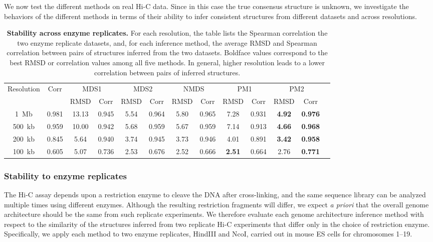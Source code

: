 We now test the different methods on real Hi-C data. Since in this case the
true consensus structure is unknown, we investigate the behaviors of the
different methods in terms of their ability to infer consistent structures
from different datasets and across resolutions.

\begin{table*}
\begin{center}
\footnotesize
\begin{tabular}{ccccccccccccc}
\hline
{\tiny Resolution} &  Corr &
\multicolumn{2}{c}{MDS1} &
\multicolumn{2}{c}{MDS2} &
\multicolumn{2}{c}{NMDS} &
\multicolumn{2}{c}{PM1} &
\multicolumn{2}{c}{PM2} \\
&& {\tiny RMSD} & Corr & {\tiny RMSD} & Corr & {\tiny RMSD} &Corr & {\tiny
RMSD} & Corr & {\tiny RMSD} & Corr \\
\hline
1~Mb  & 0.981 & 13.13 & 0.945 & 5.54 & 0.964 &  5.80 & 0.965 & 7.28  & 0.931 & \textbf{4.92} & \textbf{0.976} \\
500~kb & 0.959 & 10.00 & 0.942 & 5.68 & 0.959 & 5.67 & 0.959 & 7.14 & 0.913 & \textbf{4.66} & \textbf{0.968} \\
200~kb & 0.845 & 5.64 & 0.940 & 3.74 & 0.945 & 3.73 & 0.946 & 4.01 & 0.891 & \textbf{3.42} & \textbf{0.958} \\
100~kb &  0.605 & 5.07 & 0.736 & 2.53  & 0.676 & 2.52 & 0.666 & \textbf{2.51} & 0.664 & 2.76 & \textbf{0.771}\\
\hline
\end{tabular}
\end{center}

\caption{\textbf{Stability across enzyme replicates.} For each resolution, the
table lists the Spearman
correlation the two enzyme replicate datasets, and, for each inference
method, the average RMSD and Spearman correlation between pairs of structures
inferred from the two datasets.  Boldface values correspond to the best RMSD
or correlation values among all five methods.  In general, higher resolution
leads to a lower correlation between pairs of inferred structures.}

\label{table:results_real_data}
\end{table*}
\subsubsection{Stability to enzyme replicates}

The Hi-C assay depends upon a restriction enzyme to cleave the DNA after
cross-linking, and the same sequence library can be analyzed multiple times
using different enzymes.  Although the resulting restriction fragments will
differ, we expect {\em a priori} that the overall genome architecture should
be the same from such replicate experiments.  We therefore evaluate each
genome architecture inference method with respect to the similarity of the
structures inferred from two replicate Hi-C experiments that differ only in
the choice of restriction enzyme.  Specifically, we apply each method to two
enzyme replicates, HindIII and NcoI, carried out in mouse ES cells
\citep{dixon:topological} for chromosomes 1--19.

